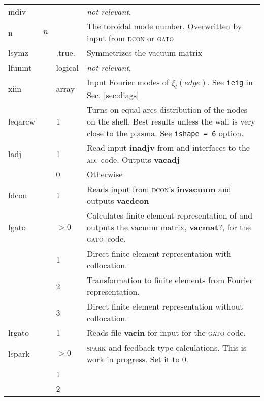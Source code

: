 \documentclass[10pt]{article}
\newcommand{\stylb}[1]{\textbf{#1}}
\newcommand{\stylc}[1]{\textsc{#1}}
\newcommand{\style}[1]{\texttt{#1}}
\newcommand{\notr}{\textsl{not relevant}}
\begin{document}
\begin{center}
\begin{tabular}{|l|l|p{1.0in}|p{3.8in}|}
mdiv      &       & & \notr.\\

n         & $n$   & & The toroidal mode number. Overwritten by input from
                      \stylc{dcon} or \stylc{gato} \\

lsymz     &       & .true. & Symmetrizes the vacuum matrix\\

lfunint   &       & logical & \notr. \\

xiin      &  & array & Input Fourier modes of $\xi_l(edge)$. See
                       \style{ieig} in Sec. \ref{sec:diags}\\

leqarcw  &  & 1 & Turns on equal arcs distribution of the nodes on the
                 shell. Best results unless the wall is very close to
                 the plasma.  See \style{ishape = 6} option. \\

ladj     &  & 1 & Read input \stylb{inadjv} from and interfaces to the
                 \stylc{adj} code. Outputs \stylb{vacadj}\\
         &  & 0 & Otherwise \\

ldcon    &  &1 & Reads input from \stylc{dcon}'s \stylb{invacuum} and outputs
\stylb{vacdcon} \\

lgato    &  & $> 0$ & Calculates finite element representation of and
outputs the vacuum matrix, \stylb{vacmat}?, for the \stylc{gato}\ code. \\
         &  & 1 & Direct finite element representation with collocation. \\
         &  & 2 & Transformation to finite elements from Fourier
representation. \\
         &  & 3 & Direct finite element representation without
collocation. \\

lrgato   &  & 1 & Reads file \stylb{vacin} for input for the
\stylc{gato} code.\\

lspark & & $> 0$ & \stylc{spark} and feedback type calculations. This
                    is work in progress. Set it to 0.\\
         &  & 1 &   \\
         &  & 2 &   \\


\end{tabular}
\end{center}
\end{document}
